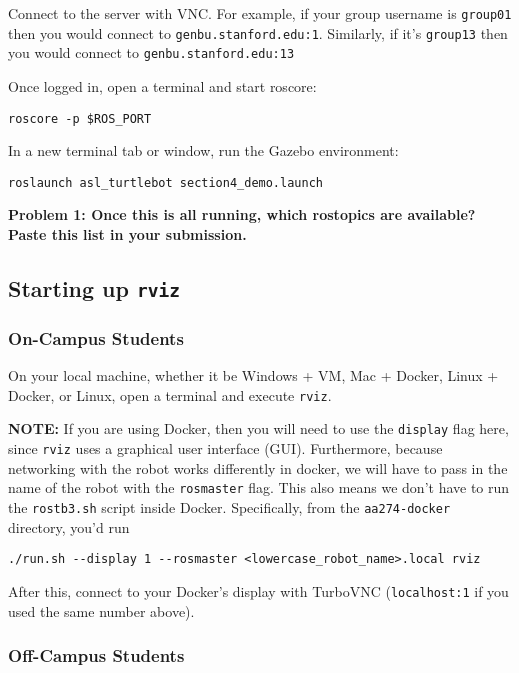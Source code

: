\documentclass{article}
\begin{document}
Connect to the server with VNC. For example, if your group username is \texttt{group01} then you would connect to \texttt{genbu.stanford.edu:1}. Similarly, if it's \texttt{group13} then you would connect to \texttt{genbu.stanford.edu:13}

Once logged in, open a terminal and start roscore:
\begin{lstlisting}
roscore -p $ROS_PORT
\end{lstlisting}

In a new terminal tab or window, run the Gazebo environment:
\begin{lstlisting}
roslaunch asl_turtlebot section4_demo.launch
\end{lstlisting}

{\bf Problem 1: Once this is all running, which rostopics are available? Paste this list in your submission.}

\subsection{Starting up \texttt{rviz}}

\subsubsection{On-Campus Students}

On your local machine, whether it be Windows + VM, Mac + Docker, Linux + Docker, or Linux, open a terminal and execute \texttt{rviz}.

{\bf NOTE:} If you are using Docker, then you will need to use the \texttt{display} flag here, since \texttt{rviz} uses a graphical user interface (GUI). Furthermore, because networking with the robot works differently in docker, we will have to pass in the name of the robot with the \texttt{rosmaster} flag. This also means we don't have to run the \texttt{rostb3.sh} script inside Docker. Specifically, from the \texttt{aa274-docker} directory, you'd run 
\begin{lstlisting}
./run.sh --display 1 --rosmaster <lowercase_robot_name>.local rviz
\end{lstlisting}
After this, connect to your Docker's display with TurboVNC (\texttt{localhost:1} if you used the same number above).

\subsubsection{Off-Campus Students}
\end{document}
